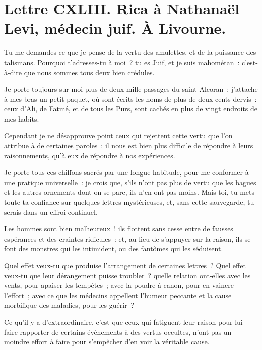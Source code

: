 \documentclass[french,twoside]{book} %
\newcommand{\dateline}[1]{\medskip{\RaggedLeft{#1}\par}\bigskip}
\begin{document}
\dateline{De Paris, le 9 de la lune de Chahban, 1720.}
\section[{Lettre CXLIII. Rica à Nathanaël Levi, médecin juif. À Livourne.}]{Lettre CXLIII. Rica à Nathanaël Levi, médecin juif. À Livourne.}\renewcommand{\leftmark}{Lettre CXLIII. Rica à Nathanaël Levi, médecin juif. À Livourne.}

\noindent Tu me demandes ce que je pense de la vertu des amulettes, et de la puissance des talismans. Pourquoi t’adresses-tu à moi ? tu es Juif, et je suis mahométan : c’est-à-dire que nous sommes tous deux bien crédules.\par
Je porte toujours sur moi plus de deux mille passages du saint Alcoran ; j’attache à mes bras un petit paquet, où sont écrits les noms de plus de deux cents dervis : ceux d’Ali, de Fatmé, et de tous les Purs, sont cachés en plus de vingt endroits de mes habits.\par
Cependant je ne désapprouve point ceux qui rejettent cette vertu que l’on attribue à de certaines paroles : il nous est bien plus difficile de répondre à leurs raisonnements, qu’à eux de répondre à nos expériences.\par
Je porte tous ces chiffons sacrés par une longue habitude, pour me conformer à une pratique universelle : je crois que, s’ils n’ont pas plus de vertu que les bagues et les autres ornements dont on se pare, ils n’en ont pas moins. Mais toi, tu mets toute ta confiance sur quelques lettres mystérieuses, et, sans cette sauvegarde, tu serais dans un effroi continuel.\par
Les hommes sont bien malheureux ! ils flottent sans cesse entre de fausses espérances et des craintes ridicules : et, au lieu de s’appuyer sur la raison, ils se font des monstres qui les intimident, ou des fantômes qui les séduisent.\par
Quel effet veux-tu que produise l’arrangement de certaines lettres ? Quel effet veux-tu que leur dérangement puisse troubler ? quelle relation ont-elles avec les vents, pour apaiser les tempêtes ; avec la poudre à canon, pour en vaincre l’effort ; avec ce que les médecins appellent l’humeur peccante et la cause morbifique des maladies, pour les guérir ?\par
Ce qu’il y a d’extraordinaire, c’est que ceux qui fatiguent leur raison pour lui faire rapporter de certains événements à des vertus occultes, n’ont pas un moindre effort à faire pour s’empêcher d’en voir la véritable cause.\par
\end{document}
